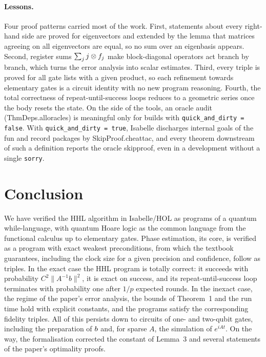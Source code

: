 \documentclass[runningheads]{llncs}
\let\ket\relax\let\bra\relax\let\braket\relax\let\ketbra\relax
\newcommand{\ket}[1]{|#1\rangle}
\newcommand{\bra}[1]{\langle #1|}
\newcommand{\braket}[2]{\langle #1|#2\rangle}
\newcommand{\ketbra}[2]{|#1\rangle\langle #2|}
\newcommand{\norm}[1]{\|#1\|}
\DeclareRobustCommand{\isa}[1]{\textsf{\def\_{\char95\allowbreak}#1}}
\begin{document}
\paragraph{Lessons.} Four proof patterns carried most of the work. First, statements about every
right-hand side are proved for eigenvectors and extended by the lemma that matrices agreeing on all
eigenvectors are equal, so no sum over an eigenbasis appears. Second, register sums
$\sum_j\ket j\otimes f_j$ make block-diagonal operators act branch by branch, which turns the error analysis
into scalar estimates. Third, every triple is proved for all gate lists with a given product, so each
refinement towards elementary gates is a circuit identity with no new program reasoning. Fourth, the
total correctness of repeat-until-success loops reduces to a geometric series once the body resets the
state. On the side of the tools, an oracle audit (\isa{Thm\_Deps.all\_oracles}) is meaningful only for
builds with \texttt{quick\_and\_dirty = false}. With \texttt{quick\_and\_dirty = true}, Isabelle discharges
internal goals of the \isa{fun} and \isa{record} packages by \isa{Skip\_Proof.cheat\_tac}, and every theorem downstream
of such a definition reports the oracle \isa{skip\_proof}, even in a development without a single
\texttt{sorry}.

\section{Conclusion}\label{sec:conclusion}

We have verified the HHL algorithm in Isabelle/HOL as programs of a quantum while-language, with
quantum Hoare logic as the common language from the functional calculus up to elementary gates. Phase
estimation, its core, is verified as a program with exact weakest preconditions, from which the
textbook guarantees, including the clock size for a given precision and confidence, follow as triples.
In the exact case the HHL program is totally correct: it succeeds with probability
$C^2\norm{A^{-1}b}^2$, it is exact on success, and its repeat-until-success loop terminates with
probability one after $1/p$ expected rounds. In the inexact case, the regime of the paper's error
analysis, the bounds of Theorem~1 and the run time hold with explicit constants, and the programs
satisfy the corresponding fidelity triples. All of this persists down to
circuits of one- and two-qubit gates, including the preparation of $\ket b$ and, for sparse $A$, the
simulation of $e^{iAt}$. On the way, the formalisation corrected the constant of Lemma~3 and several
statements of the paper's optimality proofs.
\end{document}
